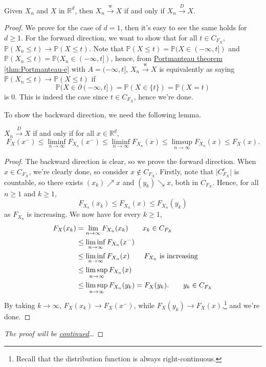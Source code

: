 \begin{theorem}\label{thm:weak-convergence-is-convergence-in-distribution}
	Given \(X_n\) and \(X\) in \(\mathbb{R} ^d\), then \(X_n \overset{\text{w} }{\to } X\) if and only if \(X_n \overset{D}{\to } X\).
\end{theorem}
\begin{proof}\let\qed\relax
	We prove for the case of \(d = 1\), then it's easy to see the same holds for \(d \geq 1\). For the forward direction, we want to show that for all \(t \in C_{F_X}\), \(\mathbb{P} (X_n \leq t) \to \mathbb{P} (X \leq t)\). Note that \(\mathbb{P} (X \leq t) = \mathbb{P} (X \in (-\infty , t])\) and \(\mathbb{P} (X_n \leq t) = \mathbb{P} (X_n \in (-\infty , t])\), hence, from \hyperref[thm:Portmanteau]{Portmanteau theorem} \autoref{thm:Portmanteau-e} with \(A = (-\infty , t]\), \(X_n \overset{\text{w} }{\to } X\) is equivalently as saying \(\mathbb{P} (X_n \leq t) \to \mathbb{P} (X \leq t)\) if
	\[
		\mathbb{P} (X \in \partial (-\infty , t])
		= \mathbb{P} (X \in \{ t \} )
		= \mathbb{P} (X = t)
	\]
	is \(0\). This is indeed the case since \(t \in C_{F_X}\), hence we're done.

	To show the backward direction, we need the following lemma.
	\begin{lemma}\label{lma:distribution-function-limit-inequality}
		\(X_n \overset{D}{\to } X\) if and only if for all \(x \in \mathbb{R} ^d\),
		\[
			F_X(x^-)
			\leq \liminf_{n \to \infty} F_{X_n} (x^-)
			\leq \liminf_{n \to \infty} F_{X_n} (x)
			\leq \limsup_{n \to \infty} F_{X_n} (x)
			\leq F_X(x).
		\]
	\end{lemma}
	\begin{proof}
		The backward direction is clear, so we prove the forward direction. When \(x\in C_{F_X}\), we're clearly done, so consider \(x \notin C_{F_X}\). Firstly, note that \(\vert C_{F_X}^{c} \vert \) is countable, so there exists \((x_k) \nearrow x\) and \((y_k) \searrow x\), both in \(C_{F_X}\). Hence, for all \(n \geq 1\) and \(k \geq 1\),
		\[
			F_{X_n}(x_k)
			\leq F_{X_n}(x)
			\leq F_{X_n}(y_k)
		\]
		as \(F_{X_n}\) is increasing. We now have for every \(k \geq 1\),
		\begin{align*}
			F_X(x_k)
			 & = \lim_{n \to \infty} F_{X_n}(x_k) \tag*{\(x_k \in C_{F_X}\)}           \\
			 & \leq \liminf_{n \to \infty} F_{X_n}(x^-)                                \\
			 & \leq \liminf_{n \to \infty} F_{X_n}(x) \tag*{\(F_{X_n}\) is increasing} \\
			 & \leq \limsup_{n \to \infty} F_{X_n}(x)                                  \\
			 & \leq \limsup_{n \to \infty} F_{X_n}(y_k)
			= F_X(y_k). \tag*{\(y_k \in C_{F_X}\)}
		\end{align*}
		By taking \(k \to \infty \), \(F_X(x_k) \to F_X(x^-)\), while \(F_X(y_k) \to F_X(x)\),\footnote{Recall that the distribution function is always right-continuous.} and we're done.
	\end{proof}
	\emph{The proof will be \hyperref[pf:thm:weak-convergence-is-convergence-in-distribution]{continued}\dots}
\end{proof}